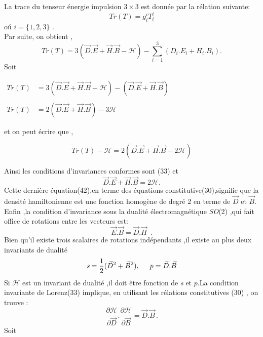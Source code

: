 \documentclass[12pt,a4paper, openany]{article}
\begin{document}
 	 La trace du tenseur énergie impulsion $3\times3$ est donnée par la rélation suivante:
 	 \begin{equation}
 	 Tr(T)= g_i^{i}T_i^i 
 	 \end{equation}
 	 o\'{u} $i=\{1,2,3\}$ .\\
 	 Par suite, on obtient ,
 	 \begin{equation}
 	 	Tr(T)=3(\vec{D}.\vec{E}+\vec{H}.\vec{B}-\mathcal{H})-\sum_{i=1}^{3}({D}_i.{E}_i+{H}_i.{B}_i). 
 	  \end{equation}
 	  Soit \\
 	  \begin{center}
 	  $\left.\begin{aligned}
 	  Tr(T)&=3(\vec{D}.\vec{E}+\vec{H}.\vec{B}-\mathcal{H})-(\vec{D}.\vec{E}+\vec{H}.\vec{B})\\
 	  \\
 	  Tr(T)&=2(\vec{D}.\vec{E}+\vec{H}.\vec{B})-3\mathcal{H}
 	  \end{aligned}\right.$\\
 	\end{center} 
 	et on peut écrire que ,
 	\begin{center}
 	\begin{equation}
 	Tr(T)-\mathcal{H}=2(\vec{D}.\vec{E}+\vec{H}.\vec{B}-2\mathcal{H})	
 	\end{equation}
 	\end{center}
 	  Ainsi les conditions d'invariances conformes sont (33) et 
 	  \begin{equation}
 	  	\vec{D}.\vec{E}+\vec{H}.\vec{B}=2\mathcal{H}.
 	  \end{equation}
 	  Cette dernière équation(42),en terme des équations constitutive(30),signifie que la densité hamiltonienne est une fonction homogène de degré 2 en terme de $\vec{D}$ et $\vec{B}$.\\
 	  
 	  \hspace{0.5cm}Enfin ,la condition d'invariance sous la dualité électromagnétique \textit{SO}(2) ,qui fait office de rotations entre les  vecteurs est:
 	  \begin{equation}
 	  	\vec{E}.\vec{B}=\vec{D}.\vec{H} \,\,\,.
 	  \end{equation}
 	  Bien qu'il existe trois scalaires de rotations indépendants ,il existe au plus deux invariants de dualité 
 	  \begin{equation}
 	  	\textit{s}=\frac{1}{2}(\vec{D}^2+\vec{B}^2) ,\hspace{0.5cm} p=\vec{D}.\vec{B}
 	 \end{equation} 
 	 Si $\mathcal{H}$ est un invariant de dualité ,il doit \^{e}tre fonction de \textit{s} et $p$.La condition invariante de Lorenz(33) implique, en utilisant les rélations constitutives (30) , on trouve  :
 	 \begin{equation}
 	 	\frac{\partial{\mathcal{H}}}{\partial{\vec{D}}}.\frac{\partial{\mathcal{H}}}{\partial{\vec{B}}}=\vec{D}.\vec{B} \,.
 	  \end{equation}
 	  Soit \\
 	  
\end{document}
